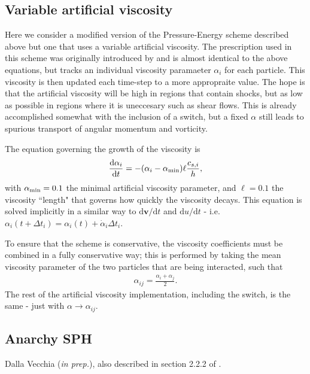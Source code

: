 
\subsection{Variable artificial viscosity}

Here we consider a modified version of the Pressure-Energy scheme described
above but one that uses a variable artificial viscosity. The prescription used
in this scheme was originally introduced by \citet{Morris1997} and is almost
identical to the above equations, but tracks an individual viscosity paramaeter
$\alpha_i$ for each particle. This viscosity is then updated each time-step to
a more appropraite value. The hope is that the artificial viscosity will be
high in regions that contain shocks, but as low as possible in regions where it
is uneccesary such as shear flows. This is already accomplished somewhat with
the inclusion of a \citet{Balsara1995} switch, but a fixed $\alpha$ still leads
to spurious transport of angular momentum and vorticity.

The equation governing the growth of the viscosity is
\begin{align}
  \frac{\mathrm{d} \alpha_i}
       {\mathrm{d} t} = 
  - (\alpha_i - \alpha_{\rm min}) \ell \frac{c_{s, i}}{h},
  \label{eq:sph:pu:alphadt}
\end{align}
with $\alpha_{\rm min}=0.1$ the minimal artificial viscosity parameter, and
$\ell=0.1$ the viscosity ``length" that governs how quickly the viscosity
decays. This equation is solved implicitly in a similar way to
$\mathrm{d}\mathbf{v}/ \mathrm{d}t$ and $\mathrm{d}u/\mathrm{d}t$ - i.e.
$\alpha_{i} (t+\Delta t_i) = \alpha_{i}(t) + \dot{\alpha}_i \Delta t_i$.

To ensure that the scheme is conservative, the viscosity coefficients must be
combined in a fully conservative way; this is performed by taking the mean
viscosity parameter of the two particles that are being interacted, such that
\begin{align}
  \alpha_{ij} = \frac{\alpha_i + \alpha_j}{2}.
\end{align}
The rest of the artificial viscosity implementation, including the
\citet{Balsara1995} switch, is the same - just with $\alpha \rightarrow
\alpha_{ij}$.

\subsection{Anarchy SPH}
Dalla Vecchia (\textit{in prep.}), also described in section 2.2.2 of
\cite{Schaller2015}.\\
\label{sec:sph:anarchy}
\tbd 
